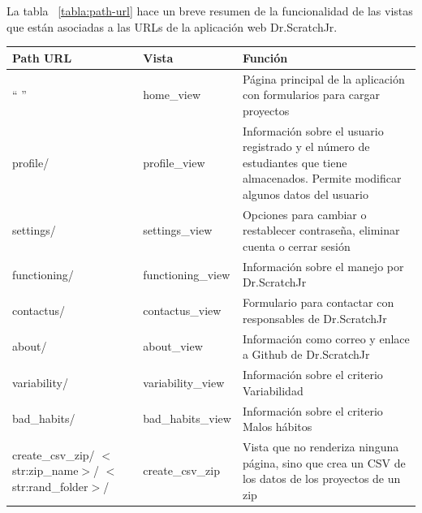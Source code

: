 \documentclass[a4paper, 12pt]{book}
\begin{document}
    \begin{table}[H]
     La tabla ~\ref{tabla:path-url} hace un breve resumen de la funcionalidad de las vistas que están asociadas a las URLs de la aplicación web Dr.ScratchJr.
     \begin{center}
     \begin{tabular}{ | m{3.1cm} | m{3.3cm} | m{8.8cm} | }
      \hline \textbf{Path URL} & \textbf{Vista} & \textbf{Función}\\ \hline
    
        `` '' &
        home\_view &
        Página principal de la aplicación con formularios para cargar proyectos \\ \hline
        
        profile/ &
        profile\_view &
        Información sobre el usuario registrado y el número de estudiantes que tiene almacenados. Permite modificar algunos datos del usuario \\ \hline 
        
        settings/ &
        settings\_view &
        Opciones para cambiar o restablecer contraseña, eliminar cuenta o cerrar sesión \\ \hline
        
        functioning/ &
        functioning\_view &
        Información sobre el manejo por Dr.ScratchJr \\ \hline
        
        contactus/ &
        contactus\_view &
        Formulario para contactar con responsables de Dr.ScratchJr \\ \hline
        
        about/ &
        about\_view &
        Información como correo y enlace a Github de Dr.ScratchJr \\ \hline
        
        variability/ &
        variability\_view &
        Información sobre el criterio Variabilidad \\ \hline
        
        bad\_habits/ &
        bad\_habits\_view &
        Información sobre el criterio Malos hábitos \\ \hline
        
        create\_csv\_zip/ \newline $<$str:zip\_name$>$/ \newline $<$str:rand\_folder$>$/ &
        create\_csv\_zip &
        Vista que no renderiza ninguna página, sino que crea un CSV de los datos de los proyectos de un zip \\ \hline
        

\end{tabular}
\end{center}
\end{table}
\end{document}
